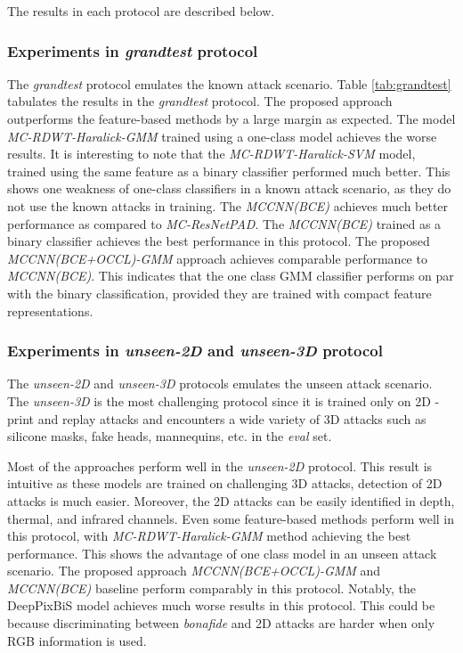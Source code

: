 \documentclass[journal]{IEEEtran}
\begin{document}
The results in each protocol are described below.
\subsubsection{Experiments in \textit{grandtest} protocol}

The \textit{grandtest} protocol emulates the known attack scenario. Table \ref{tab:grandtest} tabulates the results in the \textit{grandtest} protocol. The proposed approach outperforms the feature-based methods by a large margin as expected. The model \textit{MC-RDWT-Haralick-GMM} trained using a one-class model achieves the worse results. It is interesting to note that the \textit{MC-RDWT-Haralick-SVM} model, trained using the same feature as a binary classifier performed much better. This shows one weakness of one-class classifiers in a known attack scenario, as they do not use the known attacks in training.  The \textit{MCCNN(BCE)} achieves much better performance as compared to \textit{MC-ResNetPAD}. The \textit{MCCNN(BCE)} trained as a binary classifier achieves the best performance in this protocol. The proposed \textit{MCCNN(BCE+OCCL)-GMM} approach achieves comparable performance to \textit{MCCNN(BCE)}. This indicates that the one class GMM classifier performs on par with the binary classification, provided they are trained with compact feature representations.

\subsubsection{Experiments in \textit{unseen-2D} and \textit{unseen-3D} protocol}

The \textit{unseen-2D} and \textit{unseen-3D} protocols emulates the unseen attack scenario. The \textit{unseen-3D}  is the most challenging protocol since it is trained only on 2D - print and replay attacks and encounters a wide variety of 3D attacks such as silicone masks, fake heads, mannequins, etc. in the \textit{eval} set.

Most of the approaches perform well in the \textit{unseen-2D} protocol. This result is intuitive as these models are trained on challenging 3D attacks, detection of 2D attacks is much easier. Moreover, the 2D attacks can be easily identified in depth, thermal, and infrared channels. Even some feature-based methods perform well in this protocol, with \textit{MC-RDWT-Haralick-GMM} method achieving the best performance. This shows the advantage of one class model in an unseen attack scenario. The proposed approach \textit{MCCNN(BCE+OCCL)-GMM} and \textit{MCCNN(BCE)} baseline perform comparably in this protocol. Notably, the DeepPixBiS model achieves much worse results in this protocol. This could be because discriminating between \textit{bonafide} and 2D attacks are harder when only RGB information is used.
\end{document}
